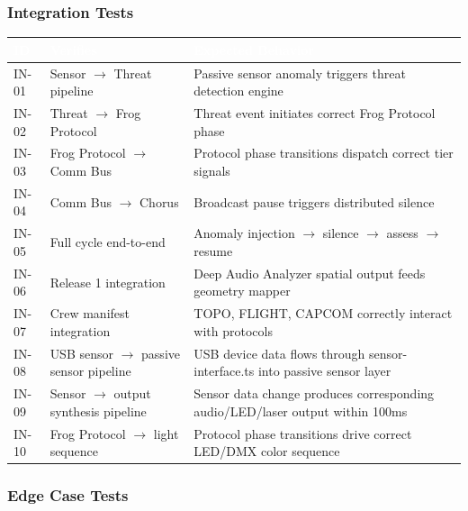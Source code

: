 \documentclass[11pt,letterpaper]{article}
\newcommand{\tableheader}[1]{\textbf{\sffamily\textcolor{white}{#1}}}
\begin{document}
\subsubsection{Integration Tests}

\begin{center}
\begin{tabularx}{\textwidth}{C{1.2cm}L{3.5cm}X}
\toprule
{}
\tableheader{ID} & \tableheader{Verifies} & \tableheader{Expected Behavior} \\
\midrule
IN-01 & Sensor $\to$ Threat pipeline & Passive sensor anomaly triggers threat detection engine \\
IN-02 & Threat $\to$ Frog Protocol & Threat event initiates correct Frog Protocol phase \\
IN-03 & Frog Protocol $\to$ Comm Bus & Protocol phase transitions dispatch correct tier signals \\
IN-04 & Comm Bus $\to$ Chorus & Broadcast pause triggers distributed silence \\
IN-05 & Full cycle end-to-end & Anomaly injection $\to$ silence $\to$ assess $\to$ resume \\
IN-06 & Release 1 integration & Deep Audio Analyzer spatial output feeds geometry mapper \\
IN-07 & Crew manifest integration & TOPO, FLIGHT, CAPCOM correctly interact with protocols \\
IN-08 & USB sensor $\to$ passive sensor pipeline & USB device data flows through sensor-interface.ts into passive sensor layer \\
IN-09 & Sensor $\to$ output synthesis pipeline & Sensor data change produces corresponding audio/LED/laser output within 100ms \\
IN-10 & Frog Protocol $\to$ light sequence & Protocol phase transitions drive correct LED/DMX color sequence \\
\bottomrule
\end{tabularx}
\end{center}

\subsubsection{Edge Case Tests}
\end{document}
